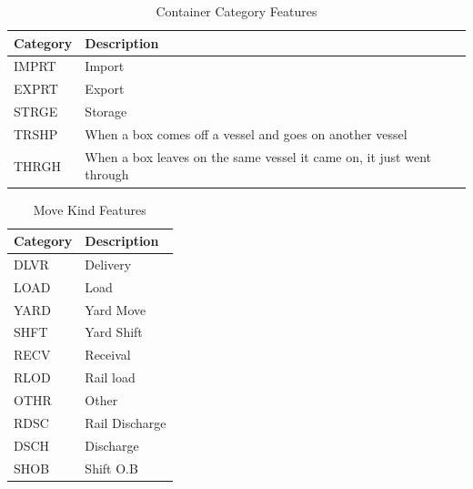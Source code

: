		\begin{table}[H]
			\centering
			\begin{tabular}{p{}p{}}
				\hline
				\textbf{Category} & \textbf{Description}                                                  \\
				\hline
				IMPRT                 & Import                                                                \\
				\hline
				EXPRT                 & Export                                                                \\
				\hline
				STRGE                 & Storage                                                               \\
				\hline
				TRSHP                 & When a box comes off a vessel and goes on another vessel              \\
				\hline
				THRGH                 & When a box leaves on the same vessel it came on, it just went through \\
				\hline
			\end{tabular}
			\caption{Container Category Features}
			\label{tab:category_features}
		\end{table}

		\begin{table}[H]
			\centering
			\begin{tabular}{p{}p{}}
				\hline
				\textbf{Category} & \textbf{Description} \\
				\hline
				DLVR                  & Delivery             \\
				\hline
				LOAD                  & Load                 \\
				\hline
				YARD                  & Yard Move            \\
				\hline
				SHFT                  & Yard Shift           \\
				\hline
				RECV                  & Receival             \\
				\hline
				RLOD                  & Rail load            \\
				\hline
				OTHR                  & Other                \\
				\hline
				RDSC                  & Rail Discharge       \\
				\hline
				DSCH                  & Discharge            \\
				\hline
				SHOB                  & Shift O.B            \\
				\hline
			\end{tabular}
			\caption{Move Kind Features}
			\label{tab:move_kind}
		\end{table}

